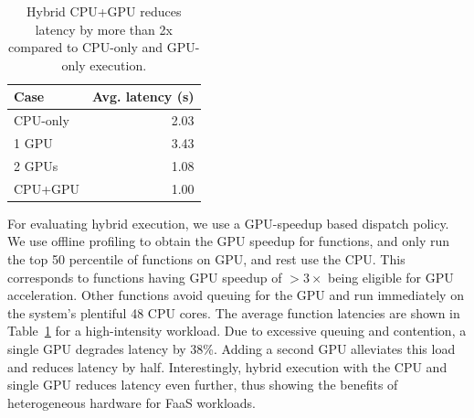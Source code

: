 

\begin{table}
  \centering
  \caption{Hybrid CPU+GPU reduces latency by more than 2x compared to CPU-only and GPU-only execution.}
  \vspace{\captionspace}
  \label{tab:cpu-gpu}
  \begin{tabular}{|l|r|}
  \hline
  Case & Avg. latency (s) \\ \hline
  CPU-only & 2.03 \\
  1 GPU & 3.43 \\
  2 GPUs & 1.08 \\
  CPU+GPU & 1.00 \\
  \hline 
\end{tabular}
\vspace{-0.4cm}
\end{table}

For evaluating hybrid execution, we use a GPU-speedup based dispatch policy.
We use offline profiling to obtain the GPU speedup for functions, and only run the top 50 percentile of functions on GPU, and rest use the CPU.
This corresponds to functions having GPU speedup of $>3\times$ being eligible for GPU acceleration. 
Other functions avoid queuing for the GPU and run immediately on the system's plentiful 48 CPU cores. 
The average function latencies are shown in Table~\ref{tab:cpu-gpu} for a high-intensity workload. 
Due to excessive queuing and contention, a single GPU degrades latency by 38\%. Adding a second GPU alleviates this load and reduces latency by half.
Interestingly, hybrid execution with the CPU and single GPU reduces latency even further, thus showing the benefits of heterogeneous hardware for FaaS workloads. 



